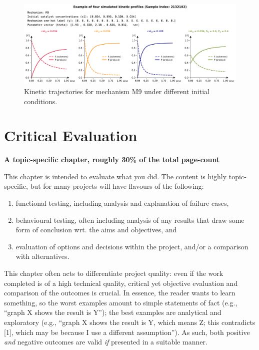 \documentclass{dissertation}
\begin{document}
\begin{figure}[H]
    \centering
    \includegraphics[width=\textwidth]{data_generation/kinetic_profile_sample.pdf}
    \caption{Kinetic trajectories for mechanism M9 under different initial conditions.}
    \label{fig:kinetic_profile_sample}
\end{figure}



\chapter{Critical Evaluation}
\label{chap:evaluation}

{\bf A topic-specific chapter, roughly 30\% of the total page-count} 
\vspace{1cm} 

\noindent
This chapter is intended to evaluate what you did.  The content is highly 
topic-specific, but for many projects will have flavours of the following:

\begin{enumerate}
\item functional  testing, including analysis and explanation of failure 
      cases,
\item behavioural testing, often including analysis of any results that 
      draw some form of conclusion wrt. the aims and objectives,
      and
\item evaluation of options and decisions within the project, and/or a
      comparison with alternatives.
\end{enumerate}

\noindent
This chapter often acts to differentiate project quality: even if the work
completed is of a high technical quality, critical yet objective evaluation 
and comparison of the outcomes is crucial.  In essence, the reader wants to
learn something, so the worst examples amount to simple statements of fact 
(e.g., ``graph X shows the result is Y''); the best examples are analytical 
and exploratory (e.g., ``graph X shows the result is Y, which means Z; this 
contradicts [1], which may be because I use a different assumption'').  As 
such, both positive {\em and}\/ negative outcomes are valid {\em if} presented 
in a suitable manner.
\end{document}
